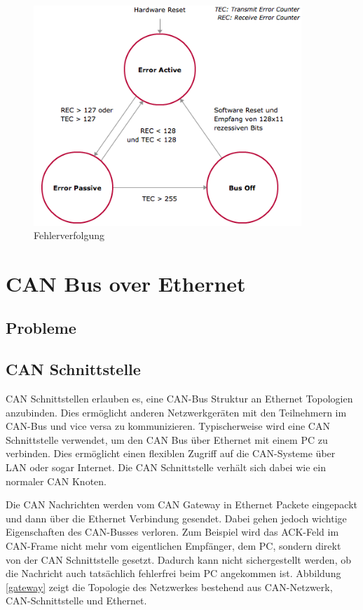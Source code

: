 \begin{figure}[h] 
\centering
\includegraphics[width=0.9\textwidth]{figures/errcount}
\caption{Fehlerverfolgung \citep{VEC}} 
\label{pic:errcount}
\end{figure} 

\clearpage
\section{CAN Bus over Ethernet}
	
\subsection{Probleme}
	
\subsection{CAN Schnittstelle}

CAN Schnittstellen erlauben es, eine CAN-Bus Struktur an Ethernet Topologien anzubinden. 
Dies ermöglicht anderen Netzwerkgeräten mit den Teilnehmern im CAN-Bus und vice versa 
zu kommunizieren. Typischerweise wird eine CAN Schnittstelle verwendet, um den CAN Bus 
über Ethernet mit einem PC zu verbinden. Dies ermöglicht einen flexiblen Zugriff auf die 
CAN-Systeme über LAN oder sogar Internet. Die CAN Schnittstelle verhält sich dabei wie 
ein normaler CAN Knoten. \citep{STE}

Die CAN Nachrichten werden vom CAN Gateway in Ethernet Packete eingepackt und dann 
über die Ethernet Verbindung gesendet. Dabei gehen jedoch wichtige Eigenschaften des 
CAN-Busses verloren. Zum Beispiel wird das ACK-Feld im CAN-Frame nicht mehr vom 
eigentlichen Empfänger, dem PC, sondern direkt von der CAN Schnittstelle gesetzt. Dadurch 
kann nicht sichergestellt werden, ob die Nachricht auch tatsächlich fehlerfrei beim PC angekommen ist.
Abbildung \ref{gateway} zeigt die Topologie des Netzwerkes bestehend aus CAN-Netzwerk, 
CAN-Schnittstelle und Ethernet.

